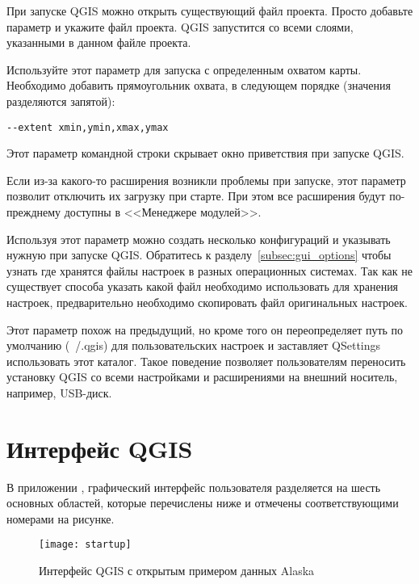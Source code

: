 При запуске QGIS можно открыть существующий файл проекта. Просто
добавьте параметр  и укажите файл проекта. QGIS
запустится со всеми слоями, указанными в данном файле проекта.

Используйте этот параметр для запуска с определенным охватом карты.
Необходимо добавить прямоугольник охвата, в следующем порядке (значения
разделяются запятой):
\begin{verbatim}
--extent xmin,ymin,xmax,ymax
\end{verbatim}

Этот параметр командной строки скрывает окно приветствия при запуске QGIS.

Если из-за какого-то расширения возникли проблемы при запуске, этот
параметр позволит отключить их загрузку при старте. При этом все расширения
будут по-прежднему доступны в <<Менеджере модулей>>.

Используя этот параметр можно создать несколько конфигураций и указывать
нужную при запуске QGIS. Обратитесь к разделу~\ref{subsec:gui_options} чтобы
узнать где хранятся файлы настроек в разных операционных системах. Так как
не существует способа указать какой файл необходимо использовать для хранения
настроек, предварительно необходимо скопировать файл оригинальных настроек.

Этот параметр похож на предыдущий, но кроме того он переопределяет путь
по умолчанию (~/.qgis) для пользовательских настроек и заставляет QSettings
использовать этот каталог. Такое поведение позволяет пользователям переносить
установку QGIS со всеми настройками и расширениями на внешний носитель, например,
USB-диск.

\section{Интерфейс QGIS}
\label{label_qgismainwindow}

В приложении \qg, графический интерфейс пользователя разделяется на шесть основных
областей, которые перечислены ниже и отмечены соответствующими номерами на рисунке.

\begin{figure}[ht]
   \centering
    \texttt{[image: startup]}
    \caption{Интерфейс QGIS с открытым примером данных Alaska \wincaption} \label{fig:startup}
\end{figure}

